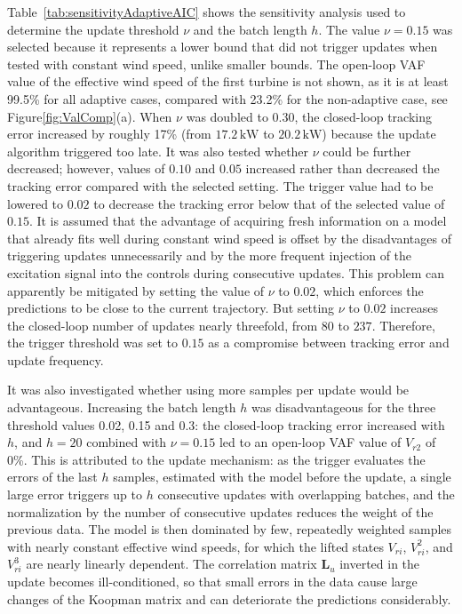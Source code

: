 Table~\ref{tab:sensitivityAdaptiveAIC} shows the sensitivity analysis used to determine the update threshold $\nu$ and the batch length $h$. The value $\nu = 0.15$ was selected because it represents a lower bound that did not trigger updates when tested with constant wind speed, unlike smaller bounds. The open-loop VAF value of the effective wind speed of the first turbine is not shown, as it is at least 99.5\% for all adaptive cases, compared with 23.2\% for the non-adaptive case, see Figure\ref{fig:ValComp}(a). When $\nu$ was doubled to $0.30$, the closed-loop tracking error increased by roughly 17\% (from $17.2\,\mathrm{kW}$ to $20.2\,\mathrm{kW}$) because the update algorithm triggered too late. It was also tested whether $\nu$ could be further decreased; however, values of $0.10$ and $0.05$ increased rather than decreased the tracking error compared with the selected setting. The trigger value had to be lowered to $0.02$ to decrease the tracking error below that of the selected value of $0.15$. It is assumed that the advantage of acquiring fresh information on a model that already fits well during constant wind speed is offset by the disadvantages of triggering updates unnecessarily and by the more frequent injection of the excitation signal into the controls during consecutive updates. This problem can apparently be mitigated by setting the value of $\nu$ to $0.02$, which enforces the predictions to be close to the current trajectory. But setting $\nu$ to $0.02$ increases the closed-loop number of updates nearly threefold, from $80$ to $237$. Therefore, the trigger threshold was set to $0.15$ as a compromise between tracking error and update frequency.

It was also investigated whether using more samples per update would be advantageous. Increasing the batch length $h$ was disadvantageous for the three threshold values 0.02, 0.15 and 0.3: the closed-loop tracking error increased with $h$, and $h = 20$ combined with $\nu = 0.15$ led to an open-loop VAF value of $V_{r2}$ of 0\%. This is attributed to the update mechanism: as the trigger evaluates the errors of the last $h$ samples, estimated with the model before the update, a single large error triggers up to $h$ consecutive updates with overlapping batches, and the normalization by the number of consecutive updates reduces the weight of the previous data. The model is then dominated by few, repeatedly weighted samples with nearly constant effective wind speeds, for which the lifted states $V_{ri}$, $V_{ri}^2$, and $V_{ri}^3$ are nearly linearly dependent. The correlation matrix $\mathbf{L}_u$ inverted in the update becomes ill-conditioned, so that small errors in the data cause large changes of the Koopman matrix and can deteriorate the predictions considerably.

